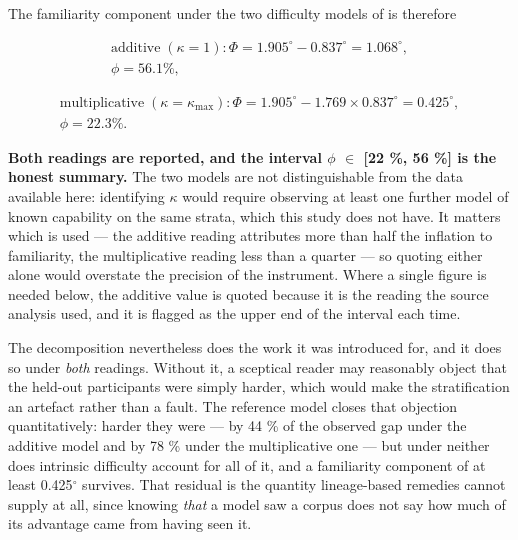 The familiarity component under the two difficulty models of  is therefore

\begin{equation}
\label{eq:174}
\begin{aligned}
\text{additive}\; (\kappa = 1): \Phi = 1.905^{\circ} - 0.837^{\circ} = 1.068^{\circ} , \\
\phi = 56.1 \% ,
\end{aligned}
\end{equation}

\begin{equation}
\label{eq:175}
\begin{aligned}
\text{multiplicative}\; (\kappa = \kappa _{\mathrm{max}}): \Phi = 1.905^{\circ} - 1.769 \times 0.837^{\circ} = 0.425^{\circ} , \\
\phi = 22.3 \% .
\end{aligned}
\end{equation}

\textbf{Both readings are reported, and the interval $\phi$ $\in$ [22 \%, 56 \%] is the honest summary.} The two models are not distinguishable from the data available here: identifying $\kappa$ would require observing at least one further model of known capability on the same strata, which this study does not have. It matters which is used --- the additive reading attributes more than half the inflation to familiarity, the multiplicative reading less than a quarter --- so quoting either alone would overstate the precision of the instrument. Where a single figure is needed below, the additive value is quoted because it is the reading the source analysis used, and it is flagged as the upper end of the interval each time.

The decomposition nevertheless does the work it was introduced for, and it does so under \emph{both} readings. Without it, a sceptical reader may reasonably object that the held-out participants were simply harder, which would make the stratification an artefact rather than a fault. The reference model closes that objection quantitatively: harder they were --- by 44 \% of the observed gap under the additive model and by 78 \% under the multiplicative one --- but under neither does intrinsic difficulty account for all of it, and a familiarity component of at least 0.425$^{\circ}$ survives. That residual is the quantity lineage-based remedies cannot supply at all, since knowing \emph{that} a model saw a corpus does not say how much of its advantage came from having seen it.

